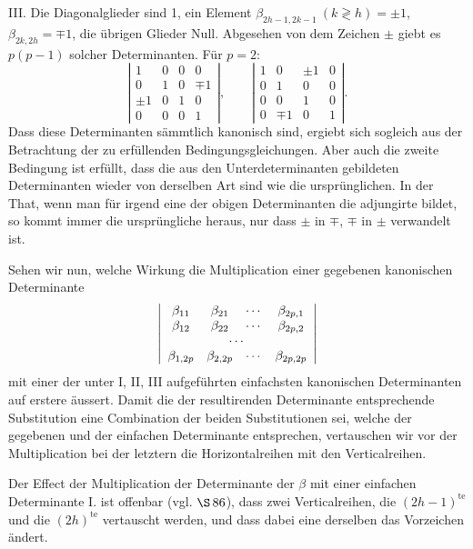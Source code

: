 \documentclass[10pt]{article}
\begin{document}
III. Die Diagonalglieder sind 1, ein Element \(\beta_{2h-1,2k-1}\ (k\gtrless h)=\pm1\), \(\beta_{2k,2h}=\mp1\), die übrigen Glieder Null. Abgesehen von dem Zeichen \(\pm\) giebt es \(p(p-1)\) solcher Determinanten. Für \(p=2\):
\[
\left|\begin{array}{rrrr}1&0&0&0\\ 0&1&0&\mp1\\ \pm1&0&1&0\\ 0&0&0&1\end{array}\right|,
\qquad
\left|\begin{array}{rrrr}1&0&\pm1&0\\ 0&1&0&0\\ 0&0&1&0\\ 0&\mp1&0&1\end{array}\right|.
\]
Dass diese Determinanten sämmtlich kanonisch sind, ergiebt sich sogleich aus der Betrachtung der zu erfüllenden Bedingungsgleichungen. Aber auch die zweite Bedingung ist erfüllt, dass die aus den Unterdeterminanten gebildeten Determinanten wieder von derselben Art sind wie die ursprünglichen. In der That, wenn man für irgend eine der obigen Determinanten die adjungirte bildet, so kommt immer die ursprüngliche heraus, nur dass \(\pm\) in \(\mp\), \(\mp\) in \(\pm\) verwandelt ist.

Sehen wir nun, welche Wirkung die Multiplication einer gegebenen kanonischen Determinante
\[
\left|\begin{array}{cccc}
\beta_{11}&\beta_{21}&\cdots&\beta_{2p,1}\\
\beta_{12}&\beta_{22}&\cdots&\beta_{2p,2}\\
\multicolumn{4}{c}{\cdots}\\
\beta_{1,2p}&\beta_{2,2p}&\cdots&\beta_{2p,2p}
\end{array}\right|
\]
mit einer der unter I, II, III aufgeführten einfachsten kanonischen Determinanten auf erstere äussert. Damit die der resultirenden Determinante entsprechende Substitution eine Combination der beiden Substitutionen sei, welche der gegebenen und der einfachen Determinante entsprechen, vertauschen wir vor der Multiplication bei der letztern die Horizontalreihen mit den Verticalreihen.

Der Effect der Multiplication der Determinante der \(\beta\) mit einer einfachen Determinante I. ist offenbar (vgl. \(\S\,86\)), dass zwei Verticalreihen, die \((2h-1)^{\mathrm{te}}\) und die \((2h)^{\mathrm{te}}\) vertauscht werden, und dass dabei eine derselben das Vorzeichen ändert.
\end{document}
